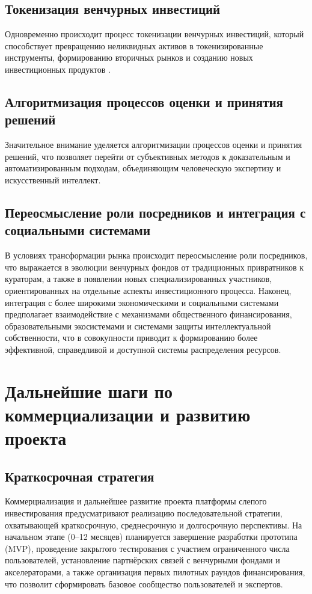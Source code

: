 \documentclass[
    candidate, %
    subf, %
    dotsinheaders=false,
]{disser}
\begin{document}
\subsection{Токенизация венчурных инвестиций}
Одновременно происходит процесс токенизации венчурных инвестиций, который способствует превращению неликвидных активов в токенизированные инструменты, формированию вторичных рынков и созданию новых инвестиционных продуктов \cite{goldstein2019fintech}.

\subsection{Алгоритмизация процессов оценки и принятия решений}
Значительное внимание уделяется алгоритмизации процессов оценки и принятия решений, что позволяет перейти от субъективных методов к доказательным и автоматизированным подходам, объединяющим человеческую экспертизу и искусственный интеллект.

\subsection{Переосмысление роли посредников и интеграция с социальными системами}
В условиях трансформации рынка происходит переосмысление роли посредников, что выражается в эволюции венчурных фондов от традиционных привратников к кураторам, а также в появлении новых специализированных участников, ориентированных на отдельные аспекты инвестиционного процесса. Наконец, интеграция с более широкими экономическими и социальными системами предполагает взаимодействие с механизмами общественного финансирования, образовательными экосистемами и системами защиты интеллектуальной собственности, что в совокупности приводит к формированию более эффективной, справедливой и доступной системы распределения ресурсов.

\section{Дальнейшие шаги по коммерциализации и развитию проекта}

\subsection{Краткосрочная стратегия}
Коммерциализация и дальнейшее развитие проекта платформы слепого инвестирования предусматривают реализацию последовательной стратегии, охватывающей краткосрочную, среднесрочную и долгосрочную перспективы. На начальном этапе (0–12 месяцев) планируется завершение разработки прототипа (MVP), проведение закрытого тестирования с участием ограниченного числа пользователей, установление партнёрских связей с венчурными фондами и акселераторами, а также организация первых пилотных раундов финансирования, что позволит сформировать базовое сообщество пользователей и экспертов.
\end{document}
